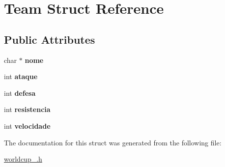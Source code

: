 \hypertarget{structTeam}{}\section{Team Struct Reference}
\label{structTeam}
\subsection*{Public Attributes}
\begin{DoxyCompactItemize}
\item 
char $\ast$ {\bfseries nome}\hypertarget{structTeam_a4148befbb5d06cf31ccf1fd5fa7bd3a7}{}\label{structTeam_a4148befbb5d06cf31ccf1fd5fa7bd3a7}

\item 
int {\bfseries ataque}\hypertarget{structTeam_aa6bc1ae085ad00ccb606673313350ca1}{}\label{structTeam_aa6bc1ae085ad00ccb606673313350ca1}

\item 
int {\bfseries defesa}\hypertarget{structTeam_a8921217611f19b408d1059f87e847582}{}\label{structTeam_a8921217611f19b408d1059f87e847582}

\item 
int {\bfseries resistencia}\hypertarget{structTeam_a08ca09195180e52c72ce36ba57be453a}{}\label{structTeam_a08ca09195180e52c72ce36ba57be453a}

\item 
int {\bfseries velocidade}\hypertarget{structTeam_acceccb4dbd69da69527fa1b8e88221c0}{}\label{structTeam_acceccb4dbd69da69527fa1b8e88221c0}

\end{DoxyCompactItemize}


The documentation for this struct was generated from the following file\+:\begin{DoxyCompactItemize}
\item 
\hyperlink{worldcup__2018_8h}{worldcup\+\_.\+h}\end{DoxyCompactItemize}

